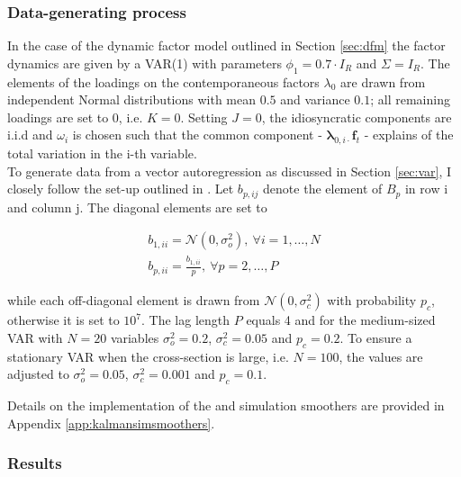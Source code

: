 \documentclass[notitlepage,a4paper,12pt]{article}
\begin{document}
\begin{ThreePartTable}
\subsubsection{Data-generating process}

In the case of the dynamic factor model outlined in Section \ref{sec:dfm} the factor dynamics are given by a VAR(1) with parameters $\phi_1 = 0.7 \cdot I_R$ and $\Sigma = I_R$. The elements of the loadings on the contemporaneous factors $\lambda_0$ are drawn from independent Normal distributions with mean $0.5$ and variance $0.1$; all remaining loadings are set to 0, i.e. $K=0$. Setting $J=0$, the idiosyncratic components are i.i.d and $\omega_i$ is chosen such that the common component - $\boldsymbol{\lambda}_{0,i\cdot} \mathbf{f}_t$ - explains  of the total variation in the i-th variable. \\

To generate data from a vector autoregression as discussed in Section \ref{sec:var}, I closely follow the set-up outlined in \citet{CHP2020_ijf}. Let $b_{p, ij}$ denote the element of $B_p$ in row i and column j. The diagonal elements are set to

\begin{subequations}
    \begin{align}
        b_{1, ii} = \mathcal{N}(0, \sigma^2_o), \: \forall i = 1, \dots, N \\
b_{p, ii} = \frac{b_{1,ii}}{p}, \: \forall p = 2, \dots, P
    \end{align}    
\end{subequations}

\noindent while each off-diagonal element is drawn from $\mathcal{N}(0, \sigma^2_c)$ with probability $p_c$, otherwise it is set to $10^7$. The lag length $P$ equals 4 and for the medium-sized VAR with $N=20$ variables $\sigma^2_o = 0.2 $, $\sigma^2_c = 0.05$ and $p_c = 0.2$. To ensure a stationary VAR when the cross-section is large, i.e. $N=100$, the values are adjusted to $\sigma^2_o = 0.05 $, $\sigma^2_c = 0.001$ and $p_c = 0.1$.

Details on the implementation of the \citet{carterkohn1994_biomtr} and \citet{durbinkoopman2002_biomtr} simulation smoothers are provided in Appendix \ref{app:kalmansimsmoothers}.\\

\subsubsection{Results}


\end{ThreePartTable}
\end{document}
